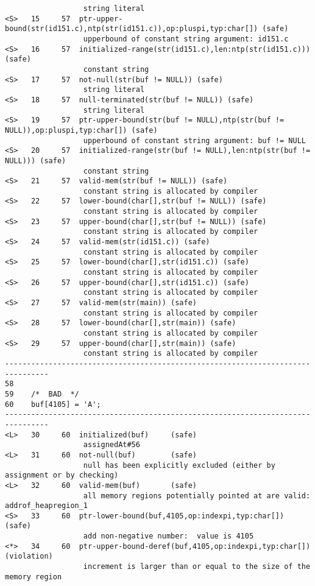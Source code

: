 \documentclass[11pt]{article}
\begin{document}
\begin{small}
\begin{verbatim}
                  string literal
<S>   15     57  ptr-upper-bound(str(id151.c),ntp(str(id151.c)),op:pluspi,typ:char[]) (safe)
                  upperbound of constant string argument: id151.c
<S>   16     57  initialized-range(str(id151.c),len:ntp(str(id151.c))) (safe)
                  constant string
<S>   17     57  not-null(str(buf != NULL)) (safe)
                  string literal
<S>   18     57  null-terminated(str(buf != NULL)) (safe)
                  string literal
<S>   19     57  ptr-upper-bound(str(buf != NULL),ntp(str(buf != NULL)),op:pluspi,typ:char[]) (safe)
                  upperbound of constant string argument: buf != NULL
<S>   20     57  initialized-range(str(buf != NULL),len:ntp(str(buf != NULL))) (safe)
                  constant string
<S>   21     57  valid-mem(str(buf != NULL)) (safe)
                  constant string is allocated by compiler
<S>   22     57  lower-bound(char[],str(buf != NULL)) (safe)
                  constant string is allocated by compiler
<S>   23     57  upper-bound(char[],str(buf != NULL)) (safe)
                  constant string is allocated by compiler
<S>   24     57  valid-mem(str(id151.c)) (safe)
                  constant string is allocated by compiler
<S>   25     57  lower-bound(char[],str(id151.c)) (safe)
                  constant string is allocated by compiler
<S>   26     57  upper-bound(char[],str(id151.c)) (safe)
                  constant string is allocated by compiler
<S>   27     57  valid-mem(str(main)) (safe)
                  constant string is allocated by compiler
<S>   28     57  lower-bound(char[],str(main)) (safe)
                  constant string is allocated by compiler
<S>   29     57  upper-bound(char[],str(main)) (safe)
                  constant string is allocated by compiler
--------------------------------------------------------------------------------
58
59    /*  BAD  */
60    buf[4105] = 'A';
--------------------------------------------------------------------------------
<L>   30     60  initialized(buf)     (safe)
                  assignedAt#56
<L>   31     60  not-null(buf)        (safe)
                  null has been explicitly excluded (either by assignment or by checking)
<L>   32     60  valid-mem(buf)       (safe)
                  all memory regions potentially pointed at are valid: addrof_heapregion_1
<S>   33     60  ptr-lower-bound(buf,4105,op:indexpi,typ:char[]) (safe)
                  add non-negative number:  value is 4105
<*>   34     60  ptr-upper-bound-deref(buf,4105,op:indexpi,typ:char[]) (violation)
                  increment is larger than or equal to the size of the memory region 

\end{verbatim}
\end{small}
\end{document}
